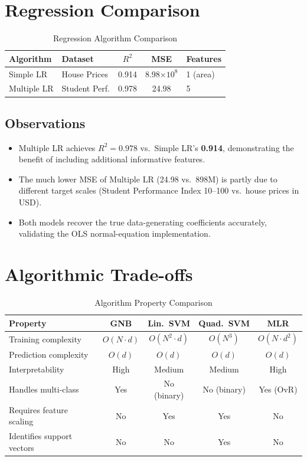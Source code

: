\documentclass[12pt,a4paper]{article}
\begin{document}
\section{Regression Comparison}

\begin{table}[H]
\centering
\caption{Regression Algorithm Comparison}
\begin{tabular}{l l c c l}
\toprule
\textbf{Algorithm} & \textbf{Dataset} & \textbf{$R^2$} & \textbf{MSE} & \textbf{Features} \\
\midrule
Simple LR   & House Prices      & 0.914 & 8.98$\times10^8$ & 1 (area) \\
Multiple LR & Student Perf.     & 0.978 & 24.98            & 5 \\
\bottomrule
\end{tabular}
\end{table}

\subsection{Observations}

\begin{itemize}
  \item Multiple LR achieves \textbf{$R^2 = 0.978$} vs.\ Simple LR's \textbf{0.914}, demonstrating the benefit of including additional informative features.
  \item The much lower MSE of Multiple LR (24.98 vs.\ 898M) is partly due to different target scales (Student Performance Index 10--100 vs.\ house prices in USD).
  \item Both models recover the true data-generating coefficients accurately, validating the OLS normal-equation implementation.
\end{itemize}

\section{Algorithmic Trade-offs}

\begin{table}[H]
\centering
\caption{Algorithm Property Comparison}
\begin{tabular}{l c c c c}
\toprule
\textbf{Property} & \textbf{GNB} & \textbf{Lin.\ SVM} & \textbf{Quad.\ SVM} & \textbf{MLR} \\
\midrule
Training complexity & $O(N \cdot d)$ & $O(N^2 \cdot d)$ & $O(N^3)$ & $O(N \cdot d^2)$ \\
Prediction complexity & $O(d)$ & $O(d)$ & $O(d)$ & $O(d)$ \\
Interpretability & High & Medium & Medium & High \\
Handles multi-class & Yes & No (binary) & No (binary) & Yes (OvR) \\
Requires feature scaling & No & Yes & Yes & No \\
Identifies support vectors & No & No & Yes & No \\
\bottomrule
\end{tabular}
\end{table}
\end{document}
